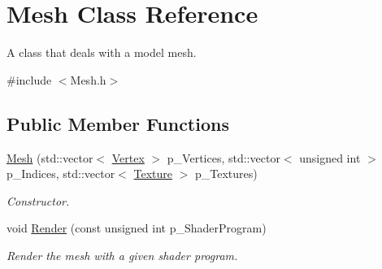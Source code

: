 \hypertarget{class_mesh}{}\section{Mesh Class Reference}
\label{class_mesh}


A class that deals with a model mesh.  




{\ttfamily \#include $<$Mesh.\+h$>$}

\subsection*{Public Member Functions}
\begin{DoxyCompactItemize}
\item 
\mbox{\hyperlink{class_mesh_a0659b5a9b01ef022c904edae670bd31a}{Mesh}} (std\+::vector$<$ \mbox{\hyperlink{struct_vertex}{Vertex}} $>$ p\+\_\+\+Vertices, std\+::vector$<$ unsigned int $>$ p\+\_\+\+Indices, std\+::vector$<$ \mbox{\hyperlink{struct_texture}{Texture}} $>$ p\+\_\+\+Textures)
\begin{DoxyCompactList}\small\item\em Constructor. \end{DoxyCompactList}\item 
void \mbox{\hyperlink{class_mesh_add468c3caa50934f33b92ef0b131bdbc}{Render}} (const unsigned int p\+\_\+\+Shader\+Program)
\begin{DoxyCompactList}\small\item\em Render the mesh with a given shader program. \end{DoxyCompactList}\end{DoxyCompactItemize}
